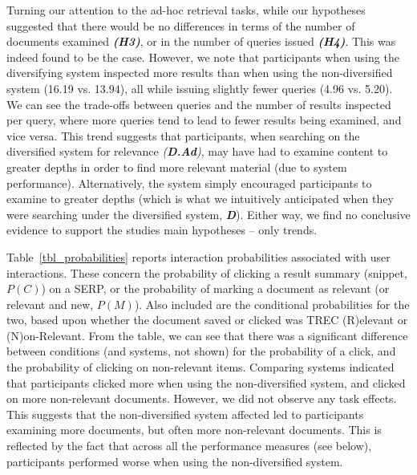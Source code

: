 Turning our attention to the ad-hoc retrieval tasks, while our hypotheses suggested that there would be no differences in terms of the number of documents examined \emph{\textbf{(H3)}}, or in the number of queries issued \emph{\textbf{(H4)}}. This was indeed found to be the case. However, we note that participants when using the diversifying system inspected more results than when using the non-diversified system (16.19 vs. 13.94), all while issuing slightly fewer queries (4.96 vs. 5.20). We can see the trade-offs between queries and the number of results inspected per query, where more queries tend to lead to fewer results being examined, and vice versa. This trend suggests that participants, when searching on the diversified system for relevance \emph{(\textbf{D.Ad})}, may have had to examine content to greater depths in order to find more relevant material (due to system performance). Alternatively, the system simply encouraged participants to examine to greater depths (which is what we intuitively anticipated when they were searching under the diversified system, \textbf{\emph{D}}). Either way, we find no conclusive evidence to support the studies main hypotheses -- only trends. 

Table~\ref{tbl_probabilities} reports interaction probabilities associated with user interactions. These concern the probability of clicking a result summary (snippet, $P(C)$) on a SERP, or the probability of marking a document as relevant (or relevant and new, $P(M)$). Also included are the conditional probabilities for the two, based upon whether the document saved or clicked was TREC (R)elevant or (N)on-Relevant. From the table, we can see that there was a significant difference between conditions (and systems, not shown) for the probability of a click, and the probability of clicking on non-relevant items. Comparing systems indicated that participants clicked more when using the non-diversified system, and clicked on more non-relevant documents. However, we did not observe any task effects. This suggests that the non-diversified system affected led to participants examining more documents, but often more non-relevant documents. This is reflected by the fact that across all the performance measures (see below), participants performed worse when using the non-diversified system.

